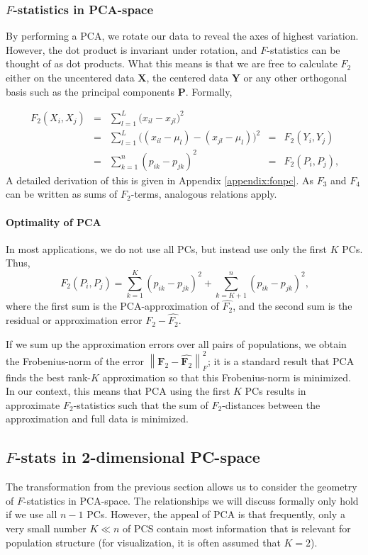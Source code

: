 \documentclass[12pt,a4pape, fullpage]{article}
\newcommand{\normsq}[1]{\left\lVert#1\right\rVert^2}
\newcommand{\MX}{\mathbf{X}} %
\newcommand{\MY}{\mathbf{Y}} %
\newcommand{\MF}{\mathbf{F}_2} %
\newcommand{\MP}{\mathbf{P}} %
\begin{document}
\subsubsection{$F$-statistics in PCA-space}
By performing a PCA, we rotate our data to reveal the axes of highest variation. However, the dot product is invariant under rotation, and $F$-statistics can be thought of as dot products.  What this means is that we are free to calculate $F_2$ either on the uncentered data $\MX$, the centered data $\MY$ or any other orthogonal basis such as the principal components $\MP$. Formally,

\begin{align}
F_2(X_i, X_j) &=&  \sum_{l=1}^L \big( x_{il} -x_{jl}\big)^2  &&\nonumber\\ 
 &=& \sum_{l=1}^L \big( (x_{il} - \mu_l) -(x_{jl} -\mu_l)\big)^2   &=& F_2(Y_i, Y_j) \nonumber\\
 &=& \sum_{k=1}^n (p_{ik} - p_{jk})^2  &=& F_2(P_i, P_j) \text{,}
\end{align}
A detailed derivation of this is given in Appendix \ref{appendix:fonpc}.
As $F_3$ and $F_4$ can be written as sums of $F_2$-terms, analogous relations apply.

\paragraph{Optimality of PCA}
In most applications, we do not use all PCs, but instead use only the first $K$ PCs.
Thus, 
\begin{equation}
F_2(P_i, P_j) = \sum_{k=1}^K(p_{ik} - p_{jk})^2 + \sum_{k=K+1}^n(p_{ik} - p_{jk})^2 \text{,}
\end{equation}
where the first sum is the PCA-approximation of $\hat{F_2}$, and the second sum is the residual or approximation error $F_2 - \hat{F_2}$.

If we sum up the approximation errors over all pairs of populations, we obtain the Frobenius-norm of the error $\normsq{\MF - \hat{\MF}}_F$; it is a standard result that PCA finds the best rank-$K$ approximation so that this Frobenius-norm is minimized. In our context, this means that PCA using the first $K$ PCs results in approximate $F_2$-statistics such that the sum of $F_2$-distances between the approximation and full data is minimized.



\subsection{$F$-stats in 2-dimensional PC-space}
The transformation from the previous section allows us to consider the geometry
of $F$-statistics in PCA-space. The relationships we will discuss formally only
hold if we use all $n-1$ PCs. However, the appeal of PCA is that frequently,
only a very small number $K \ll n$ of PCS contain most information that is
relevant for population structure (for visualization, it is often assumed that
$K=2$).
\end{document}
